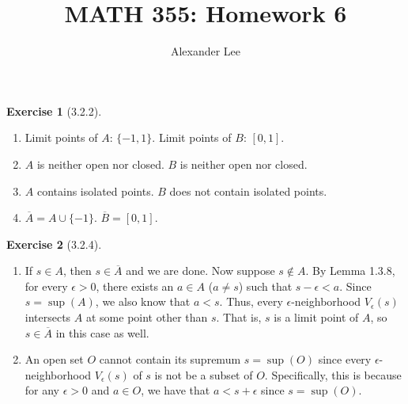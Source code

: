 \documentclass{amsart}
\title{MATH 355: Homework 6}
\author{Alexander Lee}
\theoremstyle{definition}
\newtheorem{exercise}{Exercise}
\begin{document}
\maketitle

\begin{exercise}[3.2.2]
  \begin{enumerate}[label={(\alph*)}]
    \item Limit points of $A$: $\{-1, 1\}$. Limit points of $B$: $[0, 1]$.
    \item $A$ is neither open nor closed. $B$ is neither open nor closed.
    \item $A$ contains isolated points. $B$ does not contain isolated points.
    \item $\overline{A} = A \cup \{-1\}$. $\overline{B} = [0, 1]$.
  \end{enumerate}
\end{exercise}

\begin{exercise}[3.2.4]
  \begin{enumerate}[label={(\alph*)}]
    \item If $s \in A$, then $s \in \overline{A}$ and we are done. Now suppose
      $s \notin A$. By Lemma 1.3.8, for every $\epsilon > 0$, there exists an $a
      \in A$ ($a \neq s$) such that $s - \epsilon < a$. Since $s = \sup(A)$, we
      also know that $a < s$. Thus, every $\epsilon$-neighborhood
      $V_\epsilon(s)$ intersects $A$ at some point other than $s$. That is, $s$
      is a limit point of $A$, so $s \in \overline{A}$ in this case as well.
    \item An open set $O$ cannot contain its supremum $s = \sup(O)$ since every
      $\epsilon$-neighborhood $V_\epsilon(s)$ of $s$ is not be a subset of $O$.
      Specifically, this is because for any $\epsilon > 0$ and $a \in O$, we
      have that $a < s + \epsilon$ since $s = \sup(O)$.
  \end{enumerate}
\end{exercise}
\end{document}
